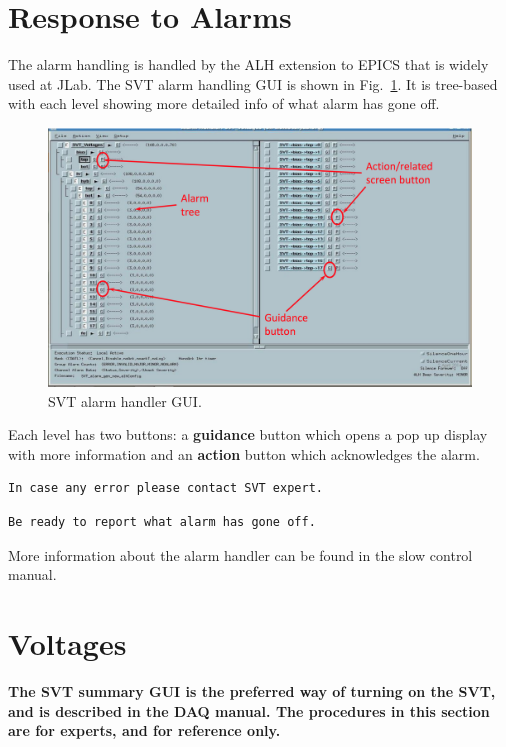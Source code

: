 \documentclass[12pt]{report}
\begin{document}
\section{Response to Alarms}

The alarm handling is handled by the ALH extension to EPICS that is widely used at JLab. The SVT alarm handling GUI is shown in Fig.~\ref{fig:svt_alarm_gui}. It is tree-based with each level showing more detailed info of what alarm has gone off. 
\begin{figure}[ht]
\includegraphics[width=12cm]{svt_alarm_gui}
\caption{SVT alarm handler GUI.\label{fig:svt_alarm_gui}}
\end{figure}

Each level has two buttons: a \textbf{guidance} button which opens a pop up display with more information and an \textbf{action} button which acknowledges the alarm. 

\begin{verbatim}
In case any error please contact SVT expert.
\end{verbatim}
\begin{verbatim}
Be ready to report what alarm has gone off.
\end{verbatim}

More information about the alarm handler can be found in the slow control manual. 

\section{Voltages}
\label{sec:proc_voltages}
\textbf{The SVT summary GUI is the preferred way of turning on the SVT, and is described in the DAQ manual. The procedures in this section are for experts, and for reference only.}
\end{document}

